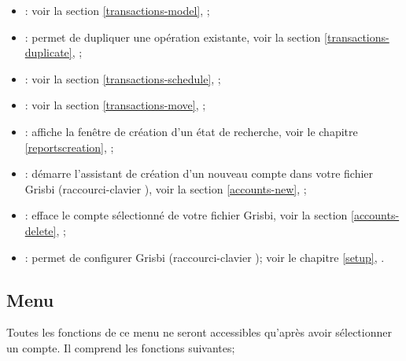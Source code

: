 \begin{itemize}	
\item {}: voir la section \vref{transactions-model}, ;
\item {}: permet de dupliquer une opération existante, voir la section \vref{transactions-duplicate}, ;
\item {}: voir la section \vref{transactions-schedule}, ;
\item {}: voir la section \vref{transactions-move}, ;
\item {}: affiche la fenêtre de	création d'un état de recherche, voir le chapitre \vref{reportscreation}, ;
\item {}: démarre l'assistant de	création d'un nouveau compte dans votre fichier Grisbi (raccourci-clavier ), voir la section \vref{accounts-new}, ;
\item {}: efface le compte sélectionné de votre fichier Grisbi, voir la section \vref{accounts-delete}, ;
\item {}: permet de configurer Grisbi (raccourci-clavier ); voir le chapitre \vref{setup}, .
\end{itemize}


\subsection{Menu \label{home-menus-display}}

Toutes les fonctions de ce menu ne seront accessibles qu'après avoir sélectionner un compte. Il comprend les fonctions suivantes;

